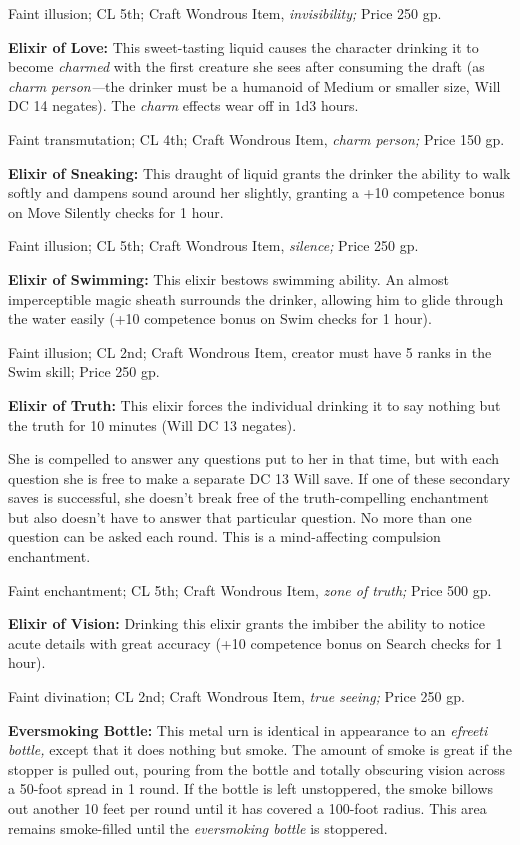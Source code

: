 Faint illusion; CL 5th; Craft Wondrous Item, \textit{invisibility; }Price 250 gp.

\textbf{Elixir of Love:} This sweet-tasting liquid causes the character drinking 
it to become \textit{charmed }with the first creature she sees after consuming 
the draft (as \textit{charm person---}the drinker must be a humanoid of Medium 
or smaller size, Will DC 14 negates). The \textit{charm }effects wear off in 1d3 
hours.

Faint transmutation; CL 4th; Craft Wondrous Item, \textit{charm person; }Price 
150 gp.

\textbf{Elixir of Sneaking:} This draught of liquid grants the drinker the ability 
to walk softly and dampens sound around her slightly, granting a +10 competence 
bonus on Move Silently checks for 1 hour.

Faint illusion; CL 5th; Craft Wondrous Item, \textit{silence; }Price 250 gp.

\textbf{Elixir of Swimming:} This elixir bestows swimming ability. An almost imperceptible 
magic sheath surrounds the drinker, allowing him to glide through the water easily 
(+10 competence bonus on Swim checks for 1 hour).

Faint illusion; CL 2nd; Craft Wondrous Item, creator must have 5 ranks in the Swim 
skill; Price 250 gp.

\textbf{Elixir of Truth: }This elixir forces the individual drinking it to say 
nothing but the truth for 10 minutes (Will DC 13 negates).

She is compelled to answer any questions put to her in that time, but with each 
question she is free to make a separate DC 13 Will save. If one of these secondary 
saves is successful, she doesn't break free of the truth-compelling enchantment 
but also doesn't have to answer that particular question. No more than one question 
can be asked each round. This is a mind-affecting compulsion enchantment.

Faint enchantment; CL 5th; Craft Wondrous Item, \textit{zone of truth; }Price 500 
gp.

\textbf{Elixir of Vision:} Drinking this elixir grants the imbiber the ability 
to notice acute details with great accuracy (+10 competence bonus on Search checks 
for 1 hour).

Faint divination; CL 2nd; Craft Wondrous Item, \textit{true seeing; }Price 250 
gp.

\textbf{Eversmoking Bottle:} This metal urn is identical in appearance to an \textit{efreeti 
bottle, }except that it does nothing but smoke. The amount of smoke is great if 
the stopper is pulled out, pouring from the bottle and totally obscuring vision 
across a 50-foot spread in 1 round. If the bottle is left unstoppered, the smoke 
billows out another 10 feet per round until it has covered a 100-foot radius. This 
area remains smoke-filled until the \textit{eversmoking bottle }is stoppered.

